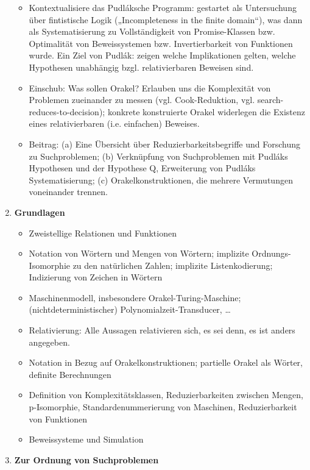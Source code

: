 \documentclass[nofonts]{uebung}
\begin{document}
\begin{enumerate}[label*=\arabic*.]
\begin{itemize}
            \item Kontextualisiere das Pudláksche Programm: gestartet als Untersuchung über fintistische Logik („Incompleteness in the finite domain“), was dann als Systematisierung zu Vollständigkeit von Promise-Klassen bzw. Optimalität von Beweissystemen bzw. Invertierbarkeit von Funktionen wurde. Ein Ziel von Pudlák: zeigen welche Implikationen gelten, welche Hypothesen unabhängig bzgl. relativierbaren Beweisen sind.
            \item Einschub: Was sollen Orakel? Erlauben uns die Komplexität von Problemen zueinander zu messen (vgl. Cook-Reduktion, vgl. search-reduces-to-decision); konkrete konstruierte Orakel widerlegen die Existenz eines relativierbaren (i.e. einfachen) Beweises.
            \item Beitrag: (a) Eine Übersicht über Reduzierbarkeitsbegriffe und Forschung zu Suchproblemen; (b) Verknüpfung von Suchproblemen mit Pudláks Hypothesen und der Hypothese Q, Erweiterung von Pudláks Systematisierung; (c) Orakelkonstruktionen, die mehrere Vermutungen voneinander trennen.
        \end{itemize}
    \item \textbf{Grundlagen}
        \begin{itemize}
            \item Zweistellige Relationen und Funktionen
            \item Notation von Wörtern und Mengen von Wörtern; implizite Ordnungs-Isomorphie zu den natürlichen Zahlen; implizite Listenkodierung; Indizierung von Zeichen in Wörtern
            \item Maschinenmodell, insbesondere Orakel-Turing-Maschine; (nichtdeterministischer) Polynomialzeit-Transducer, \ldots
            \item Relativierung: Alle Aussagen relativieren sich, es sei denn, es ist anders angegeben.
            \item Notation in Bezug auf Orakelkonstruktionen; partielle Orakel als Wörter, definite Berechnungen
            \item Definition von Komplexitätsklassen, Reduzierbarkeiten zwischen Mengen, p-Isomorphie, Standardenummerierung von Maschinen, Reduzierbarkeit von Funktionen
            \item Beweissysteme und Simulation
        \end{itemize}
    \item \textbf{Zur Ordnung von Suchproblemen}
        \begin{enumerate}[label*=\arabic*.]

\end{enumerate}
\end{enumerate}
\end{document}
